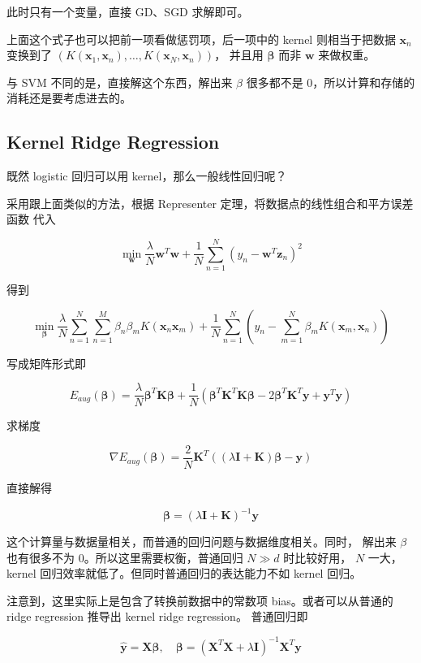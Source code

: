 \documentclass[a4paper]{article}
\begin{document}
此时只有一个变量，直接 GD、SGD 求解即可。

上面这个式子也可以把前一项看做惩罚项，后一项中的 kernel 则相当于把数据 $\mathbf{x}_n$ 变换到了 $(K(\mathbf{x}_1, \mathbf{x}_n), \dots, K(\mathbf{x}_N, \mathbf{x}_n))$，
并且用 $\bm{\beta}$ 而非 $\mathbf{w}$ 来做权重。

与 SVM 不同的是，直接解这个东西，解出来 $\beta$ 很多都不是 0，所以计算和存储的消耗还是要考虑进去的。


\subsection{Kernel Ridge Regression}
既然 logistic 回归可以用 kernel，那么一般线性回归呢？

采用跟上面类似的方法，根据 Representer 定理，将数据点的线性组合和平方误差函数
代入

$$\operatorname*{min}_{\mathbf{w}} \frac{\lambda}{N}\mathbf{w}^T\mathbf{w} + \frac{1}{N}\sum_{n=1}^{N}(y_n - \mathbf{w}^T\mathbf{z}_n)^2$$

得到

$$\operatorname*{min}_{\bm{\beta}} \frac{\lambda}{N}\sum_{n=1}^{N} \sum_{n=1}^{M} \beta_n\beta_mK(\mathbf{x}_n\mathbf{x}_m) + \frac{1}{N}\sum_{n=1}^{N} \left ( y_n - \sum_{m=1}^{N}\beta_mK(\mathbf{x}_m, \mathbf{x}_n) \right )$$

写成矩阵形式即

$$E_{aug}(\bm{\beta}) = \frac{\lambda}{N}\bm{\beta}^T\mathbf{K}\bm{\beta} + \frac{1}{N}(\bm{\beta}^T\mathbf{K}^T\mathbf{K}\bm{\beta} - 2\bm{\beta}^T\mathbf{K}^T\mathbf{y} + \mathbf{y}^T\mathbf{y})$$

求梯度

$$\nabla E_{aug}(\bm{\beta}) = \frac{2}{N} \mathbf{K}^T ((\lambda\mathbf{I} + \mathbf{K})\bm{\beta} - \mathbf{y})$$

直接解得

$$\bm{\beta} = (\lambda\mathbf{I} + \mathbf{K})^{-1}\mathbf{y}$$

这个计算量与数据量相关，而普通的回归问题与数据维度相关。同时，
解出来 $\beta$ 也有很多不为 0。所以这里需要权衡，普通回归 $N \gg d$ 时比较好用，
$N$ 一大，kernel 回归效率就低了。但同时普通回归的表达能力不如 kernel 回归。

注意到，这里实际上是包含了转换前数据中的常数项 bias。或者可以从普通的 ridge regression 推导出 kernel ridge regression。
普通回归即

$$ \hat{\mathbf{y}} = \mathbf{X}\bm{\beta}, \quad \bm{\beta} = (\mathbf{X}^T\mathbf{X} + \lambda\mathbf{I})^{-1}\mathbf{X}^T\mathbf{y}$$
\end{document}
